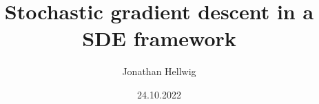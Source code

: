 \documentclass[17pt,institute=e10]{tuhh_presentation}
\title{Stochastic gradient descent in a SDE framework}
\date{24.10.2022} %
\author[Jonathan Hellwig]{Jonathan Hellwig}
\begin{document}
\titlepage











\end{document}
